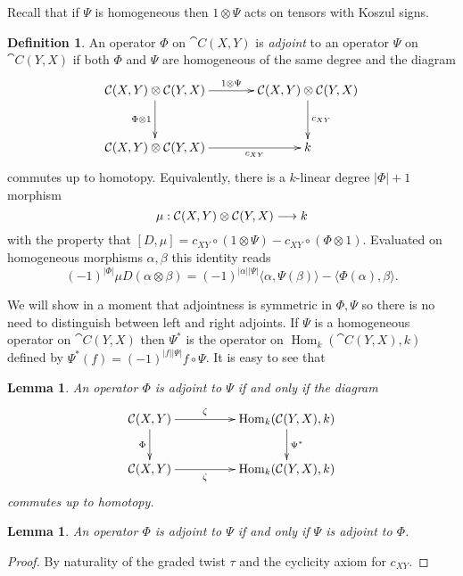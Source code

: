 \documentclass{compositio}
\newtheorem{lemma}[theorem]{Lemma}
\theoremstyle{definition}
\newtheorem{definition}[theorem]{Definition}
\numberwithin{equation}{section}
\def\Hom{\operatorname{Hom}}
\begin{document}
Recall that if $\Psi$ is homogeneous then $1 \otimes \Psi$ acts on tensors with Koszul signs.

\begin{definition}\label{defn:adjointop} An operator $\Phi$ on $\cat{C}(X,Y)$ is \emph{adjoint} to an operator $\Psi$ on $\cat{C}(Y,X)$ if both $\Phi$ and $\Psi$ are homogeneous of the same degree and the diagram
\[
\xymatrix@C+1pc@R+0.5pc{
\cat{C}(X,Y) \otimes \cat{C}(Y,X) \ar[d]_{\Phi \otimes 1} \ar[r]^{1 \otimes \Psi} & \cat{C}(X,Y) \otimes \cat{C}(Y,X) \ar[d]^{c_{XY}}\\
\cat{C}(X,Y) \otimes \cat{C}(Y,X) \ar[r]_-{c_{XY}} & k
}
\]
commutes up to homotopy. Equivalently, there is a $k$-linear degree $|\Phi|+1$ morphism
\[
\mu: \mathcal{C}(X,Y) \otimes \mathcal{C}(Y,X) \longrightarrow k
\]
with the property that $[D, \mu] = c_{XY} \circ (1 \otimes \Psi) - c_{XY} \circ ( \Phi \otimes 1)$. Evaluated on homogeneous morphisms $\alpha, \beta$ this identity reads
\begin{equation}\label{eq:adjointopeq}
(-1)^{|\Phi|} \mu D(\alpha \otimes \beta) = (-1)^{|\alpha||\Psi|}\langle \alpha, \Psi(\beta) \rangle - \langle \Phi(\alpha) , \beta \rangle.
\end{equation}
\end{definition}

We will show in a moment that adjointness is symmetric in $\Phi, \Psi$ so there is no need to distinguish between left and right adjoints. If $\Psi$ is a homogeneous operator on $\cat{C}(Y,X)$ then $\Psi^*$ is the operator on $\Hom_k(\cat{C}(Y,X),k)$ defined by $\Psi^*(f) = (-1)^{|f||\Psi|} f \circ \Psi$. It is easy to see that

\begin{lemma} An operator $\Phi$ is adjoint to $\Psi$ if and only if the diagram
\begin{equation}\label{eq:lemadjointdia}
\xymatrix@C+2pc{
\cat{C}(X,Y) \ar[d]_\Phi \ar[r]^-{\zeta} & \Hom_k( \cat{C}(Y,X), k ) \ar[d]^{\Psi^*}\\
\cat{C}(X,Y) \ar[r]_-{\zeta} & \Hom_k( \cat{C}(Y,X), k)
}
\end{equation}
commutes up to homotopy.
\end{lemma}

\begin{lemma} An operator $\Phi$ is adjoint to $\Psi$ if and only if $\Psi$ is adjoint to $\Phi$.
\end{lemma}
\begin{proof}
By naturality of the graded twist $\tau$ and the cyclicity axiom for $c_{XY}$.
\end{proof}
\end{document}
